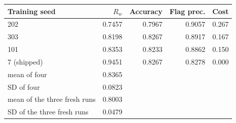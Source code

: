 \begin{tabular}{@{}lrrrr@{}}
\toprule
Training seed & $R_w$ & Accuracy & Flag prec. & Cost \\
\midrule
202 & 0.7457 & 0.7967 & 0.9057 & 0.267 \\
303 & 0.8198 & 0.8267 & 0.8917 & 0.167 \\
101 & 0.8353 & 0.8233 & 0.8862 & 0.150 \\
7 (shipped) & 0.9451 & 0.8267 & 0.8278 & 0.000 \\
\midrule
mean of four & 0.8365 & & & \\
SD of four & 0.0823 & & & \\
mean of the three fresh runs & 0.8003 & & & \\
SD of the three fresh runs & 0.0479 & & & \\
\bottomrule
\end{tabular}
